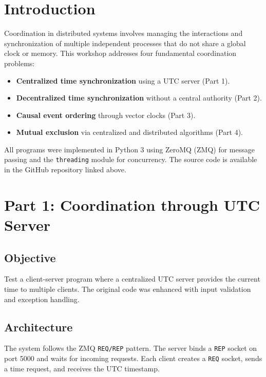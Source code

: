 \documentclass[12pt,a4paper]{article}
\begin{document}
\section{Introduction}

Coordination in distributed systems involves managing the interactions and synchronization of multiple independent processes that do not share a global clock or memory. This workshop addresses four fundamental coordination problems:

\begin{itemize}
    \item \textbf{Centralized time synchronization} using a UTC server (Part 1).
    \item \textbf{Decentralized time synchronization} without a central authority (Part 2).
    \item \textbf{Causal event ordering} through vector clocks (Part 3).
    \item \textbf{Mutual exclusion} via centralized and distributed algorithms (Part 4).
\end{itemize}

All programs were implemented in Python 3 using ZeroMQ (ZMQ) for message passing and the \texttt{threading} module for concurrency. The source code is available in the GitHub repository linked above.

\section{Part 1: Coordination through UTC Server}

\subsection{Objective}

Test a client-server program where a centralized UTC server provides the current time to multiple clients. The original code was enhanced with input validation and exception handling.

\subsection{Architecture}

The system follows the ZMQ \texttt{REQ/REP} pattern. The server binds a \texttt{REP} socket on port 5000 and waits for incoming requests. Each client creates a \texttt{REQ} socket, sends a time request, and receives the UTC timestamp.
\end{document}
